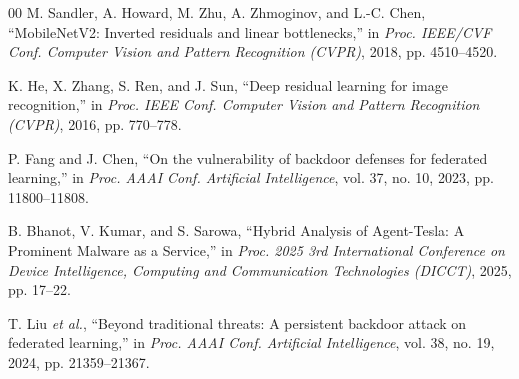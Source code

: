 \documentclass[conference]{IEEEtran}
\begin{document}
\begin{thebibliography}{00}
M. Sandler, A. Howard, M. Zhu, A. Zhmoginov, and L.-C. Chen,
``MobileNetV2: Inverted residuals and linear bottlenecks,''
in \emph{Proc. IEEE/CVF Conf. Computer Vision and Pattern Recognition (CVPR)},
2018, pp. 4510--4520.

K. He, X. Zhang, S. Ren, and J. Sun,
``Deep residual learning for image recognition,''
in \emph{Proc. IEEE Conf. Computer Vision and Pattern Recognition (CVPR)},
2016, pp. 770--778.

P. Fang and J. Chen,
``On the vulnerability of backdoor defenses for federated learning,''
in \emph{Proc. AAAI Conf. Artificial Intelligence}, vol. 37, no. 10,
2023, pp. 11800--11808.

B. Bhanot, V. Kumar, and S. Sarowa, 
``Hybrid Analysis of Agent-Tesla: A Prominent Malware as a Service,'' 
in \emph{Proc. 2025 3rd International Conference on Device Intelligence, Computing and Communication Technologies (DICCT)}, 
2025, pp. 17--22.

T. Liu \emph{et al.}, 
``Beyond traditional threats: A persistent backdoor attack on federated learning,'' 
in \emph{Proc. AAAI Conf. Artificial Intelligence}, 
vol. 38, no. 19, 2024, pp. 21359--21367.

\end{thebibliography}
\end{document}
